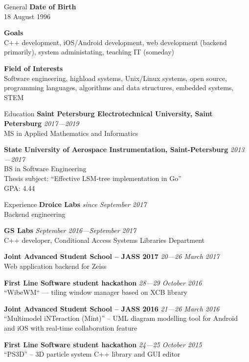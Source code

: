 \documentclass{resume}
\begin{document}
\begin{rSection}{General}
    {\bf Date of Birth} \\
        18 August 1996

    {\bf Goals} \\
        C++ development, iOS\slash Android development, web development (backend primarily),
        system administating, teaching IT (someday)

    {\bf Field of Interests} \\
        Software engineering, highload systems, Unix/Linux systems, open source, programming languages,
        algorithms and data structures, embedded systems, STEM
\end{rSection}

\begin{rSection}{Education}
    {\bf Saint Petersburg Electrotechnical University, Saint Petersburg} \hfill {\em 2017---2019} \\ 
    MS in Applied Mathematics and Informatics
    
    {\bf State University of Aerospace Instrumentation, Saint-Petersburg} \hfill {\em 2013---2017} \\ 
    BS in Software Engineering \\
    Thesis subject: ``Effective LSM-tree implementation in Go'' \\
    GPA: 4.44
\end{rSection}

\begin{rSection}{Experience}
    {\bf Droice Labs} \hfill {\em since September 2017} \\
        Backend engineering
    
    {\bf GS Labs} \hfill {\em September 2016---September 2017} \\
        C++ developer, Conditional Access Systems Libraries Department
        
    {\bf Joint Advanced Student School -- JASS 2017} \hfill {\em 20---26 March 2017} \\
        Web application backend for Zeiss
        
    {\bf First Line Software student hackathon} \hfill {\em 28---29 October 2016} \\
        ``WibeWM`` --- tiling window manager based on XCB library
        
    {\bf Joint Advanced Student School -- JASS 2016} \hfill {\em 21---26 March 2016} \\
        ``Multimodel iNTeraction (Mint)'' -- UML diagram modelling tool for Android and iOS with real-time collaboration feature

    {\bf First Line Software student hackathon} \hfill {\em 24---25 October 2015} \\
        ``PS3D'' -- 3D particle system C++ library and GUI editor
\end{rSection}
\end{document}
